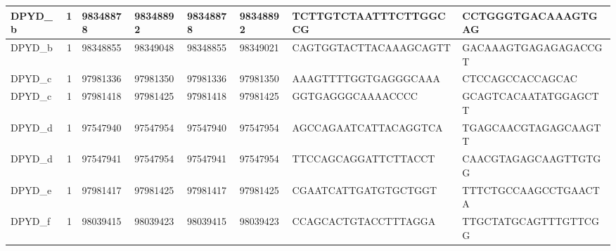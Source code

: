 \begin{landscape}
\begin{longtable}{| p{} | p{} | p{} | p{} | p{} | p{} | p{} | p{} |}
\multicolumn{1}{|l|}{DPYD\_b}    & \multicolumn{1}{c|}{1}  & \multicolumn{1}{l|}{98348878}  & \multicolumn{1}{l|}{98348892}  & \multicolumn{1}{l|}{98348878}  & \multicolumn{1}{l|}{98348892}  & \multicolumn{1}{l|}{TCTTGTCTAATTTCTTGGCCG}           & \multicolumn{1}{l|}{CCTGGGTGACAAAGTGAG}            \\ \hline
\multicolumn{1}{|l|}{DPYD\_b}    & \multicolumn{1}{c|}{1}  & \multicolumn{1}{l|}{98348855}  & \multicolumn{1}{l|}{98349048}  & \multicolumn{1}{l|}{98348855}  & \multicolumn{1}{l|}{98349021}  & \multicolumn{1}{l|}{CAGTGGTACTTACAAAGCAGTT}          & \multicolumn{1}{l|}{GACAAAGTGAGAGAGACCGT}          \\ \hline
\multicolumn{1}{|l|}{DPYD\_c}    & \multicolumn{1}{c|}{1}  & \multicolumn{1}{l|}{97981336}  & \multicolumn{1}{l|}{97981350}  & \multicolumn{1}{l|}{97981336}  & \multicolumn{1}{l|}{97981350}  & \multicolumn{1}{l|}{AAAGTTTTGGTGAGGGCAAA}            & \multicolumn{1}{l|}{CTCCAGCCACCAGCAC}              \\ \hline
\multicolumn{1}{|l|}{DPYD\_c}    & \multicolumn{1}{c|}{1}  & \multicolumn{1}{l|}{97981418}  & \multicolumn{1}{l|}{97981425}  & \multicolumn{1}{l|}{97981418}  & \multicolumn{1}{l|}{97981425}  & \multicolumn{1}{l|}{GGTGAGGGCAAAACCCC}               & \multicolumn{1}{l|}{GCAGTCACAATATGGAGCTT}          \\ \hline
\multicolumn{1}{|l|}{DPYD\_d}    & \multicolumn{1}{c|}{1}  & \multicolumn{1}{l|}{97547940}  & \multicolumn{1}{l|}{97547954}  & \multicolumn{1}{l|}{97547940}  & \multicolumn{1}{l|}{97547954}  & \multicolumn{1}{l|}{AGCCAGAATCATTACAGGTCA}           & \multicolumn{1}{l|}{TGAGCAACGTAGAGCAAGTT}          \\ \hline
\multicolumn{1}{|l|}{DPYD\_d}    & \multicolumn{1}{c|}{1}  & \multicolumn{1}{l|}{97547941}  & \multicolumn{1}{l|}{97547954}  & \multicolumn{1}{l|}{97547941}  & \multicolumn{1}{l|}{97547954}  & \multicolumn{1}{l|}{TTCCAGCAGGATTCTTACCT}            & \multicolumn{1}{l|}{CAACGTAGAGCAAGTTGTGG}          \\ \hline
\multicolumn{1}{|l|}{DPYD\_e}    & \multicolumn{1}{c|}{1}  & \multicolumn{1}{l|}{97981417}  & \multicolumn{1}{l|}{97981425}  & \multicolumn{1}{l|}{97981417}  & \multicolumn{1}{l|}{97981425}  & \multicolumn{1}{l|}{CGAATCATTGATGTGCTGGT}            & \multicolumn{1}{l|}{TTTCTGCCAAGCCTGAACTA}          \\ \hline
\multicolumn{1}{|l|}{DPYD\_f}    & \multicolumn{1}{c|}{1}  & \multicolumn{1}{l|}{98039415}  & \multicolumn{1}{l|}{98039423}  & \multicolumn{1}{l|}{98039415}  & \multicolumn{1}{l|}{98039423}  & \multicolumn{1}{l|}{CCAGCACTGTACCTTTAGGA}            & \multicolumn{1}{l|}{TTGCTATGCAGTTTGTTCGG}          \\ \hline

\end{longtable}
\end{landscape}
